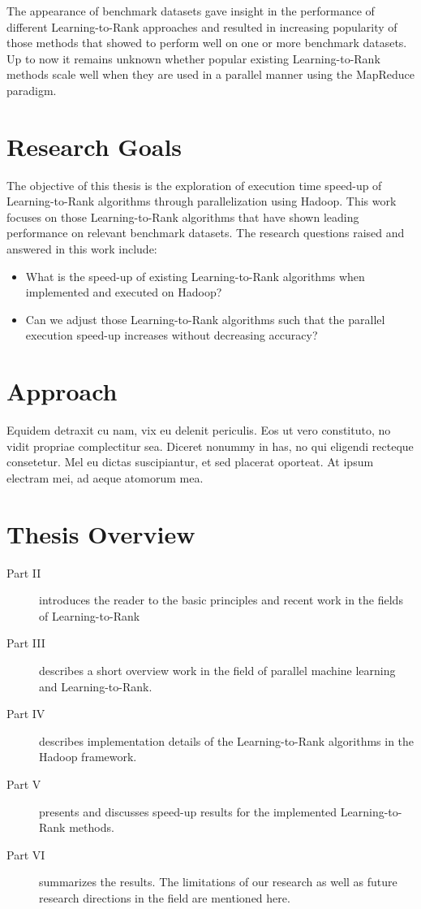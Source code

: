 The appearance of benchmark datasets gave insight in the performance of different Learning-to-Rank approaches and resulted in increasing popularity of those methods that showed to perform well on one or more benchmark datasets. Up to now it remains unknown whether popular existing Learning-to-Rank methods scale well when they are used in a parallel manner using the MapReduce paradigm.\\

\chapter{Research Goals}
The objective of this thesis is the exploration of execution time speed-up of Learning-to-Rank algorithms through parallelization using Hadoop. 
This work focuses on those Learning-to-Rank algorithms that have shown leading performance on relevant benchmark datasets.
The research questions raised and answered in this work include:
\begin{itemize}
\item What is the speed-up of existing Learning-to-Rank algorithms when implemented and executed on Hadoop?
\item Can we adjust those Learning-to-Rank algorithms such that the parallel execution speed-up increases without decreasing accuracy?
\end{itemize}

\chapter{Approach}
Equidem detraxit cu nam, vix eu delenit periculis. Eos ut vero
constituto, no vidit propriae complectitur sea. Diceret nonummy in
has, no qui eligendi recteque consetetur. Mel eu dictas suscipiantur,
et sed placerat oporteat. At ipsum electram mei, ad aeque atomorum
mea.

\chapter{Thesis Overview}

\begin{description}
\item[Part II ]{introduces the reader to the basic principles and recent work in the fields of Learning-to-Rank}
\item[Part III ]{describes a short overview work in the field of parallel machine learning and Learning-to-Rank.}
\item[Part IV ]{describes implementation details of the Learning-to-Rank algorithms in the Hadoop framework.}
\item[Part V ]{presents and discusses speed-up results for the implemented Learning-to-Rank methods.}
\item[Part VI ]{summarizes the results. The limitations of our research as well as future research directions in the field are mentioned here.}
\end{description}